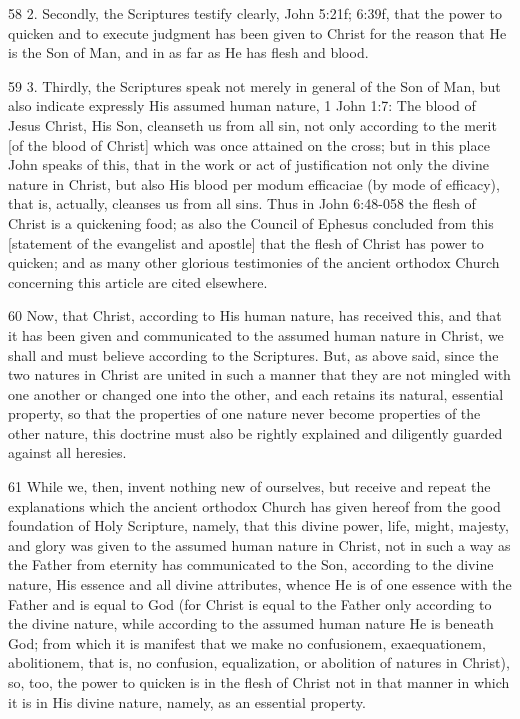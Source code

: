 {58 2. Secondly, the Scriptures testify clearly, John 5:21f; 6:39f, that the power to quicken and to execute judgment has been given to Christ for the reason that He is the Son of Man, and in as far as He has flesh and blood.

59 3. Thirdly, the Scriptures speak not merely in general of the Son of Man, but also indicate expressly His assumed human nature, 1 John 1:7: The blood of Jesus Christ, His Son, cleanseth us from all sin, not only according to the merit [of the blood of Christ] which was once attained on the cross; but in this place John speaks of this, that in the work or act of justification not only the divine nature in Christ, but also His blood per modum efficaciae (by mode of efficacy), that is, actually, cleanses us from all sins. Thus in John 6:48-058 the flesh of Christ is a quickening food; as also the Council of Ephesus concluded from this [statement of the evangelist and apostle] that the flesh of Christ has power to quicken; and as many other glorious testimonies of the ancient orthodox Church concerning this article are cited elsewhere.

60 Now, that Christ, according to His human nature, has received this, and that it has been given and communicated to the assumed human nature in Christ, we shall and must believe according to the Scriptures. But, as above said, since the two natures in Christ are united in such a manner that they are not mingled with one another or changed one into the other, and each retains its natural, essential property, so that the properties of one nature never become properties of the other nature, this doctrine must also be rightly explained and diligently guarded against all heresies.

61 While we, then, invent nothing new of ourselves, but receive and repeat the explanations which the ancient orthodox Church has given hereof from the good foundation of Holy Scripture, namely, that this divine power, life, might, majesty, and glory was given to the assumed human nature in Christ, not in such a way as the Father from eternity has communicated to the Son, according to the divine nature, His essence and all divine attributes, whence He is of one essence with the Father and is equal to God (for Christ is equal to the Father only according to the divine nature, while according to the assumed human nature He is beneath God; from which it is manifest that we make no confusionem, exaequationem, abolitionem, that is, no confusion, equalization, or abolition of natures in Christ), so, too, the power to quicken is in the flesh of Christ not in that manner in which it is in His divine nature, namely, as an essential property.

}
